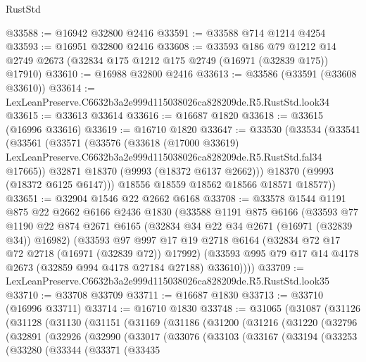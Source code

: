 \begin{lexlean}{RustStd}
\begin{coremodule}
@33588 := @16942 @32800 @2416
@33591 := @33588 @714 @1214 @4254
@33593 := @16951 @32800 @2416
@33608 := @33593
    @186
    @79
    @1212
    @14
    @2749
    @2673
    (@32834 @175 @1212 @175 @2749 (@16971 (@32839 @175)) @17910)
@33610 := @16988 @32800 @2416
@33613 := @33586 (@33591 (@33608 @33610))
@33614 := LexLeanPreserve.C6632b3a2e999d115038026ca828209de.R5.RustStd.look34
@33615 := @33613 @33614
@33616 := @16687 @1820
@33618 := @33615 (@16996 @33616)
@33619 := @16710 @1820
@33647 := @33530
    (@33534
      (@33541
        (@33561
          (@33571
            (@33576
              (@33618
                (@17000 @33619)
                LexLeanPreserve.C6632b3a2e999d115038026ca828209de.R5.RustStd.fal34
                @17665))
            @32871
            @18370
            (@9993 (@18372 @6137 @2662)))
          @18370
          (@9993 (@18372 @6125 @6147)))
        @18556
        @18559
        @18562
        @18566
        @18571
        @18577))
@33651 := @32904 @1546 @22 @2662 @6168
@33708 := @33578
    @1544
    @1191
    @875
    @22
    @2662
    @6166
    @2436
    @1830
    (@33588
      @1191
      @875
      @6166
      (@33593
        @77
        @1190
        @22
        @874
        @2671
        @6165
        (@32834 @34 @22 @34 @2671 (@16971 (@32839 @34)) @16982)
        (@33593
          @97
          @997
          @17
          @19
          @2718
          @6164
          (@32834 @72 @17 @72 @2718 (@16971 (@32839 @72)) @17992)
          (@33593 @995 @79 @17 @14 @4178 @2673 (@32859 @994 @4178 @27184 @27188) @33610))))
@33709 := LexLeanPreserve.C6632b3a2e999d115038026ca828209de.R5.RustStd.look35
@33710 := @33708 @33709
@33711 := @16687 @1830
@33713 := @33710 (@16996 @33711)
@33714 := @16710 @1830
@33748 := @31065
    (@31087
      (@31126
        (@31128
          (@31130
            (@31151
              (@31169
                (@31186
                  (@31200
                    (@31216
                      (@31220
                        (@32796
                          (@32891
                            (@32926
                              (@32990
                                (@33017
                                  (@33076
                                    (@33103
                                      (@33167
                                        (@33194
                                          (@33253
                                            (@33280
                                              (@33344
                                                (@33371
                                                  (@33435

\end{coremodule}
\end{lexlean}
